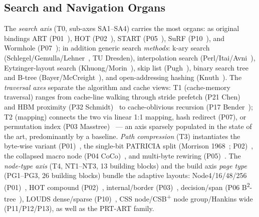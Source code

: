 \subsection{Search and Navigation Organs}\label{ssec:sota-ax-nav}
The \emph{search axis} (T0, sub-axes SA1--SA4) carries the most organs: as original bindings ART
(P01~\cite{leis2013art}), HOT (P02~\cite{binna2018hot}), START (P05~\cite{fent2020start}), SuRF
(P10~\cite{zhang2018surf}), and Wormhole (P07~\cite{wu2019wormhole}); in addition generic search
\emph{methods}: k-ary search (Schlegel/Gemulla/Lehner~\cite{schlegel2009kary}, TU Dresden),
interpolation search (Perl/Itai/Avni~\cite{perl1978interpolation}), Eytzinger-layout search
(Khuong/Morin~\cite{khuong2017eytzinger}), skip list (Pugh~\cite{pugh1990skiplist}), binary search
tree and B-tree (Bayer/McCreight~\cite{bayer1972btree}), and open-addressing hashing
(Knuth~\cite{knuth1998taocp3}). The \emph{traversal axes} separate the algorithm and cache views: T1
(cache-memory traversal) ranges from cache-line walking through stride prefetch (P21
Chen)~\cite{chen2001prefetch} and HBM proximity (P32 Schmidt)~\cite{schmidt2025hbm} to
cache-oblivious recursion (P17 Bender~\cite{frigo1999cache}); T2 (mapping) connects the two via
linear 1:1 mapping, hash redirect (P07), or permutation index (P03 Masstree)~\cite{mao2012masstree}
--- an axis sparsely populated in the state of the art, predominantly by a baseline.
\emph{Path compression} (T3) instantiates the byte-wise variant (P01)~\cite{leis2013art}, the
single-bit PATRICIA split (Morrison 1968~\cite{morrison1968patricia}; P02)~\cite{binna2018hot}, the
collapsed macro node (P04 CoCo)~\cite{boffa2024coco}, and multi-byte rewiring
(P05)~\cite{fent2020start}. The \emph{node-type axis} (T4, NT1--NT3, 13 building blocks) and the
build axis \emph{page type} (PG1--PG3, 26 building blocks) bundle the adaptive layouts:
Node4/16/48/256 (P01)~\cite{leis2013art}, HOT compound (P02)~\cite{binna2018hot}, internal/border
(P03)~\cite{mao2012masstree}, decision/span (P06
B\textsuperscript{2}-tree~\cite{schmeisser2022b2tree}), LOUDS dense/sparse
(P10)~\cite{zhang2018surf}, CSS node/CSB\textsuperscript{+} node group/Hankins wide (P11/P12/P13),
as well as the PRT-ART family.

